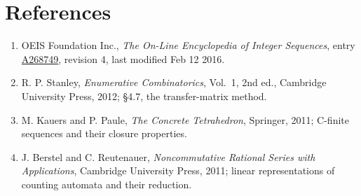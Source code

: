 \documentclass[11pt]{article}
\theoremstyle{definition}
\begin{document}
\section{References}

\begin{enumerate}

\item OEIS Foundation Inc., \emph{The On-Line Encyclopedia of Integer Sequences}, entry \href{https://oeis.org/A268749}{A268749}, revision 4, last modified Feb 12 2016.

\item R. P. Stanley, \emph{Enumerative Combinatorics}, Vol.~1, 2nd ed., Cambridge University Press, 2012; \S4.7, the transfer-matrix method.

\item M. Kauers and P. Paule, \emph{The Concrete Tetrahedron}, Springer, 2011; C-finite sequences and their closure properties.

\item J. Berstel and C. Reutenauer, \emph{Noncommutative Rational Series with Applications}, Cambridge University Press, 2011; linear representations of counting automata and their reduction.

\end{enumerate}
\end{document}
